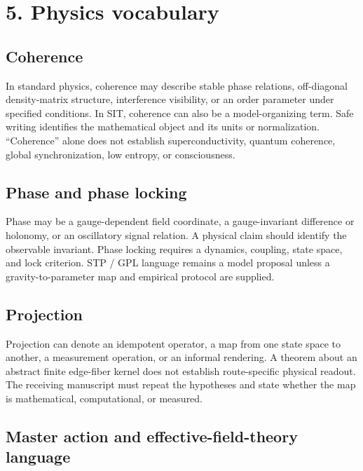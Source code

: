 \documentclass[
  american,
  11pt,
  letterpaper,
]{article}
\begin{document}
\section{5. Physics vocabulary}\label{physics-vocabulary}

\subsection{Coherence}\label{coherence}

In standard physics, coherence may describe stable phase relations, off-diagonal density-matrix structure, interference visibility, or an order parameter under specified conditions. In SIT, coherence can also be a model-organizing term. Safe writing identifies the mathematical object and its units or normalization. ``Coherence'' alone does not establish superconductivity, quantum coherence, global synchronization, low entropy, or consciousness.

\subsection{Phase and phase locking}\label{phase-and-phase-locking}

Phase may be a gauge-dependent field coordinate, a gauge-invariant difference or holonomy, or an oscillatory signal relation. A physical claim should identify the observable invariant. Phase locking requires a dynamics, coupling, state space, and lock criterion. STP / GPL language remains a model proposal unless a gravity-to-parameter map and empirical protocol are supplied.

\subsection{Projection}\label{projection}

Projection can denote an idempotent operator, a map from one state space to another, a measurement operation, or an informal rendering. A theorem about an abstract finite edge-fiber kernel does not establish route-specific physical readout. The receiving manuscript must repeat the hypotheses and state whether the map is mathematical, computational, or measured.

\subsection{Master action and effective-field-theory language}\label{master-action-and-effective-field-theory-language}
\end{document}
